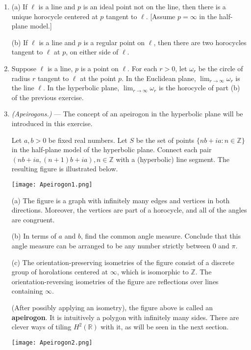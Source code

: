 \documentclass[leqno]{book}
\begin{document}
\begin{enumerate}
\item (a) If $\ell$ is a line and $p$ is an ideal point not on the line, then there is a unique horocycle centered at $p$ tangent to $\ell$.  [Assume $p=\infty$ in the half-plane model.]

(b) If $\ell$ is a line and $p$ is a regular point on $\ell$, then there are two horocycles tangent to $\ell$ at $p$, on either side of $\ell$.

\item Suppose $\ell$ is a line, $p$ is a point on $\ell$.  For each $r>0$, let $\omega_r$ be the circle of radius $r$ tangent to $\ell$ at the point $p$.  In the Euclidean plane, $\lim_{r\to\infty}\omega_r$ is the line $\ell$.  In the hyperbolic plane, $\lim_{r\to\infty}\omega_r$ is the horocycle of part (b) of the previous exercise.

\item\emph{(Apeirogons.)} \---- The concept of an apeirogon in the hyperbolic plane will be introduced in this exercise.

Let $a,b>0$ be fixed real numbers.  Let $S$ be the set of points $\{nb+ia:n\in\mathbb Z\}$ in the half-plane model of the hyperbolic plane.  Connect each pair $(nb+ia,(n+1)b+ia),n\in\mathbb Z$ with a (hyperbolic) line segment.  The resulting figure is illustrated below.
\begin{center}\texttt{[image: Apeirogon1.png]}\end{center}
(a) The figure is a graph with infinitely many edges and vertices in both directions.  Moreover, the vertices are part of a horocycle, and all of the angles are congruent.

(b) In terms of $a$ and $b$, find the common angle measure.  Conclude that this angle measure can be arranged to be any number strictly between $0$ and $\pi$.

(c) The orientation-preserving isometries of the figure consist of a discrete group of horolations centered at $\infty$, which is isomorphic to $\mathbb Z$.  The orientation-reversing isometries of the figure are reflections over lines containing $\infty$.

(After possibly applying an isometry), the figure above is called an \textbf{apeirogon}.  It is intuitively a polygon with infinitely many sides.  There are clever ways of tiling $H^2(\mathbb R)$ with it, as will be seen in the next section.
\begin{center}\texttt{[image: Apeirogon2.png]}\end{center} %
\end{enumerate}
\end{document}
